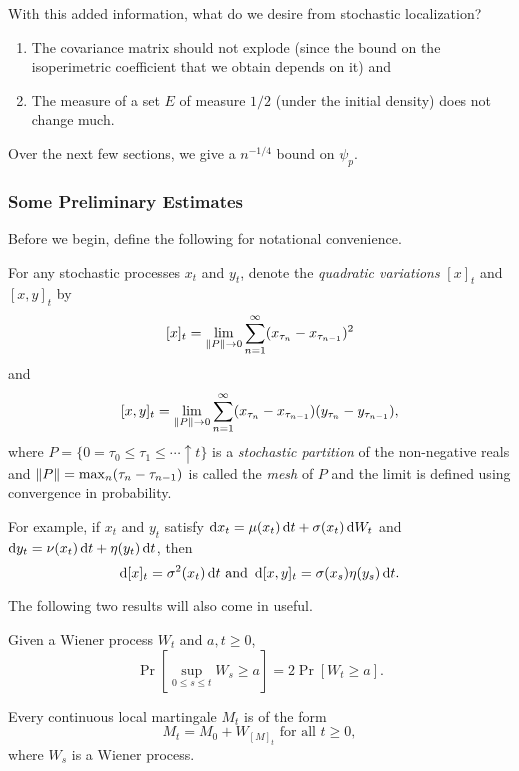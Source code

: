		With this added information, what do we desire from stochastic localization?
		\begin{enumerate}
			\item The covariance matrix should not explode (since the bound on the isoperimetric coefficient that we obtain depends on it) and
			\item The measure of a set $E$ of measure $1/2$ (under the initial density) does not change much.
		\end{enumerate}

		Over the next few sections, we give a $n^{-1/4}$ bound on $\psi_p$.

	\subsubsection{Some Preliminary Estimates}

		Before we begin, define the following for notational convenience.
		\begin{definition}
			For any stochastic processes $x_t$ and $y_t$, denote the \textit{quadratic variations} $[x]_t$ and $[x,y]_t$ by
			\[ [x]_t = \lim_{\left\lVert P\right\rVert \to 0} \sum_{n=1}^\infty (x_{\tau_n} - x_{\tau_{n-1}})^2 \]
			and
			\[ [x,y]_t = \lim_{\left\lVert P\right\rVert \to 0} \sum_{n=1}^\infty (x_{\tau_n} - x_{\tau_{n-1}})(y_{\tau_n} - y_{\tau_{n-1}}), \]
			where $P = \{ 0 = \tau_0 \leq \tau_1 \leq \cdots \uparrow t \}$ is a \textit{stochastic partition} of the non-negative reals and $\left\lVert P\right\rVert = \max_n (\tau_n - \tau_{n-1})$ is called the \textit{mesh} of $P$ and the limit is defined using convergence in probability.
		\end{definition}

		For example, if $x_t$ and $y_t$ satisfy $\operatorname{d}\!{x}_t = \mu(x_t) \operatorname{d}\!{t} + \sigma(x_t)\operatorname{d}\!{W}_t$ and $\operatorname{d}\!{y}_t = \nu(x_t) \operatorname{d}\!{t} + \eta(y_t) \operatorname{d}\!{t}$, then
		\[ \operatorname{d}\!{[x]_t} = \sigma^2(x_t) \operatorname{d}\!{t} \text{ and } \operatorname{d}\!{[x,y]_t} = \sigma(x_s)\eta(y_s) \operatorname{d}\!{t}. \]

		The following two results will also come in useful.

		\begin{lemma}
			Given a Wiener process $W_t$ and $a,t\geq 0$,
			\[ \Pr\left[\sup_{0 \leq s \leq t} W_s \geq a\right] = 2 \Pr\left[W_t \geq a\right]. \]
		\end{lemma}

		\begin{theorem}
			\label{Dambis Dubins Schwarz Th}
			Every continuous local martingale $M_t$ is of the form
			\[ M_t = M_0 + W_{[M]_t} \text{ for all } t \geq 0, \]
			where $W_s$ is a Wiener process.
		\end{theorem}

